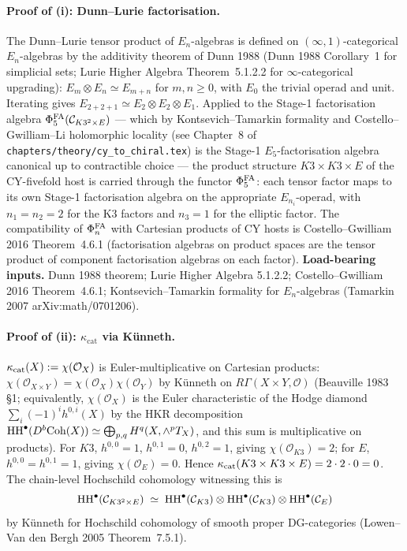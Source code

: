 \paragraph{Proof of \textup{(i)}: Dunn--Lurie factorisation.}
The Dunn--Lurie tensor product of $E_n$-algebras is defined on
$(\infty,1)$-categorical $E_n$-algebras by the additivity theorem
of Dunn 1988 (Dunn 1988 Corollary~1 for simplicial sets; Lurie Higher
Algebra Theorem~5.1.2.2 for $\infty$-categorical upgrading):
$E_m \otimes E_n \simeq E_{m+n}$ for $m, n \geq 0$, with $E_0$ the
trivial operad and unit. Iterating gives
$E_{2 + 2 + 1} \simeq E_2 \otimes E_2 \otimes E_1$. Applied to the
Stage-1 factorisation algebra
$\Phi^{\mathrm{FA}}_5(\mathcal C_{K3^2 \times E})$ --- which by
Kontsevich--Tamarkin formality and Costello--Gwilliam--Li
holomorphic locality (see Chapter~$8$ of
\texttt{chapters/theory/cy\_to\_chiral.tex}) is the Stage-1
$E_5$-factorisation algebra canonical up to contractible choice
--- the product structure $K3 \times K3 \times E$ of the CY-fivefold
host is carried through the functor $\Phi^{\mathrm{FA}}_5$: each tensor factor
maps to its own Stage-1 factorisation algebra on the appropriate
$E_{n_i}$-operad, with $n_1 = n_2 = 2$ for the K3 factors and
$n_3 = 1$ for the elliptic factor. The compatibility of $\Phi^{\mathrm{FA}}_n$
with Cartesian products of CY hosts is Costello--Gwilliam 2016
Theorem~4.6.1 (factorisation algebras on product spaces are the
tensor product of component factorisation algebras on each factor).
\textbf{Load-bearing inputs.} Dunn 1988 theorem; Lurie Higher Algebra
5.1.2.2; Costello--Gwilliam 2016 Theorem~4.6.1; Kontsevich--Tamarkin
formality for $E_n$-algebras (Tamarkin 2007 arXiv:math/0701206).

\paragraph{Proof of \textup{(ii)}: $\kappa_{\mathrm{cat}}$ via
K\"unneth.}
$\kappa_{\mathrm{cat}}(X) := \chi(\mathcal O_X)$ is Euler-multiplicative on Cartesian
products: $\chi(\mathcal O_{X \times Y}) = \chi(\mathcal O_X)
\chi(\mathcal O_Y)$ by K\"unneth on $R\Gamma(X \times Y, \mathcal O)$
(Beauville 1983 \S 1; equivalently, $\chi(\mathcal O_X)$ is the Euler
characteristic of the Hodge diamond $\sum_i (-1)^i h^{0,i}(X)$ by
the HKR decomposition $\mathrm{HH}^\bullet(D^b\mathrm{Coh}(X)) \simeq
\bigoplus_{p,q} H^q(X, \wedge^p T_X)$, and this sum is multiplicative
on products). For $K3$, $h^{0, 0} = 1$, $h^{0, 1} = 0$, $h^{0, 2} = 1$,
giving $\chi(\mathcal O_{K3}) = 2$; for $E$, $h^{0, 0} = h^{0, 1} = 1$,
giving $\chi(\mathcal O_E) = 0$. Hence $\kappa_{\mathrm{cat}}(K3 \times K3 \times E) =
2 \cdot 2 \cdot 0 = 0$. The chain-level Hochschild cohomology
witnessing this is
\[
  \mathrm{HH}^\bullet(\mathcal C_{K3^2 \times E})
  \;\simeq\;
  \mathrm{HH}^\bullet(\mathcal C_{K3}) \otimes \mathrm{HH}^\bullet(\mathcal C_{K3})
  \otimes \mathrm{HH}^\bullet(\mathcal C_E)
\]
by K\"unneth for Hochschild cohomology of smooth proper DG-categories
(Lowen--Van den Bergh 2005 Theorem~7.5.1).

